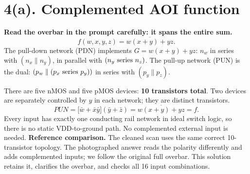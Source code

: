 \documentclass[11pt,a4paper]{article}
\newcommand{\VDD}{V_{\mathrm{DD}}}
\newcommand{\VSS}{V_{\mathrm{SS}}}
\newcommand{\MOS}[5]{
  \coordinate (#1) at (#2,#3);
  \coordinate (#1t) at ($(#1)+(0,.55)$);
  \coordinate (#1b) at ($(#1)+(0,-.55)$);
  \draw (#1t)--($(#1)+(0,.30)$)--($(#1)+(-.18,.30)$);
  \draw ($(#1)+(-.18,.34)$)--($(#1)+(-.18,-.34)$);
  \draw ($(#1)+(-.18,-.30)$)--($(#1)+(0,-.30)$)--(#1b);
  \draw ($(#1)+(-.35,.33)$)--($(#1)+(-.35,-.33)$);
  \def\type{#5}\def\ptype{p}
  \ifx\type\ptype
    \draw ($(#1)+(-.78,0)$)--($(#1)+(-.53,0)$);
    \draw ($(#1)+(-.465,0)$) circle (.065);
    \draw ($(#1)+(-.40,0)$)--($(#1)+(-.35,0)$);
  \else
    \draw ($(#1)+(-.78,0)$)--($(#1)+(-.35,0)$);
  \fi
  \node[anchor=east] at ($(#1)+(-.82,0)$) {$#4$};
  \node[anchor=west,font=\scriptsize] at ($(#1)+(.10,0)$) {#1};
}
\begin{document}
\section*{4(a). Complemented AOI function}
\textbf{Read the overbar in the prompt carefully: it spans the entire sum.}
\[
 \boxed{f(w,x,y,z)=\overline{w(x+y)+yz}.}
\]
The pull-down network (PDN) implements $G=w(x+y)+yz$: $n_w$ in series with $(n_x\parallel n_y)$, in parallel with $(n_y\hbox{ series }n_z)$.
The pull-up network (PUN) is the dual:
$(p_w\parallel(p_x\hbox{ series }p_y))$ in series with $(p_y\parallel p_z)$.
\begin{center}
\end{center}
There are five nMOS and five pMOS devices: \textbf{10 transistors total}. Two devices are separately controlled by $y$ in each network; they are distinct transistors.
\[
 PUN=\bigl[\bar w+\bar x\bar y\bigr](\bar y+\bar z)
     =\overline{w(x+y)+yz}=f.
\]
Every input has exactly one conducting rail network in ideal switch logic, so there is no static VDD-to-ground path. No complemented external input is needed.
\textbf{Reference comparison.} The cleaned scan uses the same correct 10-transistor topology. The photographed answer reads the polarity differently and adds complemented inputs; we follow the original full overbar. This solution retains it, clarifies the overbar, and checks all 16 input combinations.
\newpage
\end{document}
